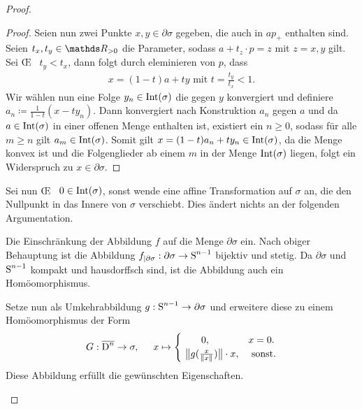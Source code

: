 \begin{Satz}
\begin{proof}
\begin{enumerate}[(a):]
\begin{Beh}
\begin{proof}
          Seien nun zwei Punkte $x,y \in \partial\sigma$ gegeben, die
          auch in $ap_+$ enthalten sind. Seien $t_x, t_y \in \R_{> 0}$
          die Parameter, sodass $a + t_z \cdot p = z$ mit
          $z = x,y$ gilt. Sei \OE~ $t_y < t_x$, dann folgt
          durch eleminieren von $p$, dass
          \begin{gather*}
            x = (1-t) a + ty \text{ mit } t=\frac{t_y}{t_x} < 1.
          \end{gather*}
          Wir wählen nun eine Folge $y_n \in \Int(\sigma)$ die gegen $y$
          konvergiert und definiere
          $a_n \coloneqq \frac{1}{1-t} (x -ty_n)$.  Dann konvergiert
          nach Konstruktion $a_n$ gegen $a$ und da
          $a \in \Int(\sigma)$ in einer offenen Menge enthalten ist,
          existiert ein $n \geq 0$, sodass für alle $m \geq n$ gilt
          $a_m \in \Int(\sigma)$.  Somit gilt
          $x = (1-t) a_n + ty_n \in \Int(\sigma)$, da die Menge konvex
          ist und die Folgenglieder ab einem $m$ in der Menge
          $\Int(\sigma)$ liegen, folgt ein Widerspruch zu
          $x \in \partial\sigma$.
        \end{proof}
      \end{Beh}
      Sei nun \OE~ $0 \in \Int(\sigma)$, sonst wende eine affine
      Transformation auf $\sigma$ an, die den Nullpunkt in das Innere
      von $\sigma$ verschiebt. Dies ändert nichts an der folgenden
      Argumentation.

      Die Einschränkung der Abbildung $f$ auf die Menge
      $\partial\sigma$ ein. Nach obiger Behauptung ist die Abbildung
      $f_{| \partial\sigma} : \partial\sigma \rightarrow \Sp^{n-1}$
      bijektiv und stetig. Da $\partial\sigma$ und $\Sp^{n-1}$ kompakt
      und hausdorffsch sind, ist die Abbildung auch ein
      Homöomorphismus.
      
      Setze nun als Umkehrabbildung $g : \Sp^{n-1} \rightarrow \partial\sigma$ 
      und erweitere diese zu einem Homöomorphismus der Form
      \begin{gather*}
        G : \overline{\D^n} \rightarrow \sigma , \hspace{0.5cm}
        x \mapsto 
        \begin{cases}
          \hspace{.7cm}0, &  x = 0. \\
          ~\bigl\| g(\frac{x}{\nn[x]}) \bigr\|
          \cdot x, & \text{ sonst}.
        \end{cases}
      \end{gather*}
      Diese Abbildung erfüllt die gewünschten Eigenschaften.
    \end{enumerate}
  \end{proof}
\end{Satz}



